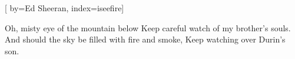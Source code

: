 
[%
    by={Ed Sheeran},
    index={iseefire}]


    \label{iseefire}



    \beginverse*
        Oh, misty eye of the mountain below
        Keep careful watch of my brother's souls.
        And should the sky be filled with fire and smoke,
        Keep watching over Durin's son.
    \endverse

